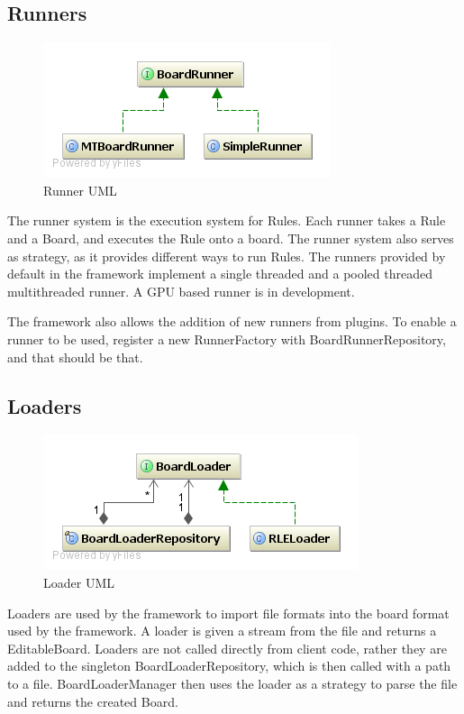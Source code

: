 \documentclass{report}
\begin{document}
\subsection{Runners}
\begin{figure}[H]
\includegraphics[scale=.4]{RunnerCD}
\caption{Runner UML}
\label{UML:runner}
\end{figure} 
The runner system is the execution system for Rules. Each runner takes a Rule
and a Board, and executes the Rule onto a board. The runner system also serves
as strategy, as it provides different ways to run Rules. The runners provided by
default in the framework implement a single threaded and a pooled threaded
multithreaded runner. A GPU based runner is in development.


The framework also allows the addition of new runners from plugins. To enable a
runner to be used, register a new RunnerFactory with BoardRunnerRepository, and
that should be that.
\subsection{Loaders}
\begin{figure}[H]
\includegraphics[scale=.4]{LoaderCD}
\caption{Loader UML}
\label{UML:loader}
\end{figure}
Loaders are used by the framework to import file formats into the board format
used by the framework. A loader is given a stream from the file and returns a
EditableBoard. Loaders are not called directly from client code, rather they are
added to the singleton BoardLoaderRepository, which is then called with a path
to a file. BoardLoaderManager then uses the loader as a strategy to parse the
file and returns the created Board.
\end{document}
